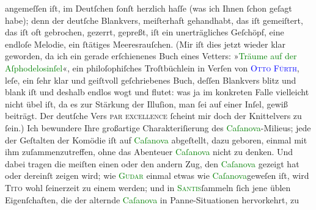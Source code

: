                     angemeſſen iſt, im Deutſchen ſonſt herzlich haſſe (was ich Ihnen ſchon geſagt
                    habe); denn der deutſche Blankvers, mei{\pb}ſterhaft gehandhabt, das iſt
                    gemeiſtert, das iſt oft gebrochen, gezerrt, gepreßt, iſt ein unerträgliches
                    Geſchöpf, eine endloſe Melodie, ein ſtätiges Meeresrauſchen. (Mir iſt dies jetzt
                    wieder klar geworden, da ich ein gerade erſchienenes Buch eines Vetters: »\textcolor{green}{Träume auf der Aſphodelosinſel}{}\ledrightnote{\textcolor{green}{Träume auf der Asphodelosinsel}}«, ein
                    philoſophiſches Troſtbüchlein in Verſen von \textcolor{blue}{\textsc{Otto Fürth}}{}\ledrightnote{\textcolor{blue}{Otto Fürth}}, leſe, ein ſehr klar und geiſtvoll
                    geſchriebenes Buch, deſſen Blankvers blitz und blank iſt und deshalb endlos wogt
                    und flutet: was ja im konkreten Falle vielleicht nicht übel iſt, da es zur
                    Stärkung der Illuſion, man ſei auf einer Inſel, gewiß beiträgt. Der deutſche
                    Vers \textsc{par excellence}{ }ſcheint mir doch der Knittelvers zu ſein.)\pend
           \pstart
           Ich bewundere Ihre großartige Charakteriſierung des \textcolor{green}{Caſanova}{}-Milieus; jede der Geſtalten der Komödie iſt
                    auf \textcolor{green}{Caſanova}{} abgeſtellt,
                    dazu geboren, einmal mit ihm zuſammenzutreffen, ohne das Abenteuer \textcolor{green}{Caſanova}{} nicht zu denken.
                    Und dabei tragen die meiſten einen oder den andern Zug, den \textcolor{green}{Caſanova}{} gezeigt hat oder dereinſt
                    zeigen wird; wie \textcolor{green}{\textsc{Gudar}}{} einmal etwas wie \textcolor{green}{Caſanova}{}geweſen iſt, wird \textsc{Tito} wohl ſeinerzeit zu einem werden; und in \textcolor{green}{\textsc{Santis}}{}ſammeln ſich jene üblen Eigenſchaften, die der alternde \textcolor{green}{Caſanova}{} in \strikeout{\textcolor{gray}{geeigne}} Panne-Situationen hervorkehrt, zu 
